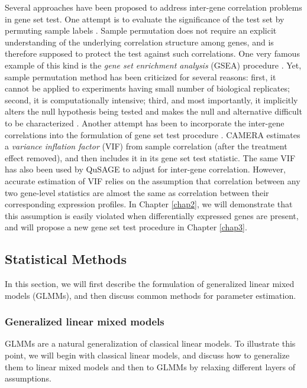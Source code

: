 Several approaches have been proposed to address inter-gene correlation problems in gene set test.
One attempt is to evaluate the significance of the test set by permuting sample labels
\citep{efron2007testing,gatti2010heading,subramanian2005gene}. Sample permutation does not require
an explicit understanding of the underlying correlation structure among genes, and is therefore
supposed to protect the test against such correlations. One very famous example of this kind is the
\textit{gene set enrichment analysis} (GSEA) procedure \citep{subramanian2005gene}. Yet, sample
permutation method has been criticized for several reasons: first, it cannot be applied to
experiments having small
number of biological replicates; second, it is computationally intensive; third, and most
importantly, it implicitly alters the null hypothesis being tested and makes the null and
alternative difficult to be characterized \citep{goeman2007analyzing, khatri2012ten, wu2012camera}.
Another attempt has been to incorporate the inter-gene correlations into the formulation of gene set
test procedure \citep{wu2012camera,yaari2013quantitative}. CAMERA \citep{wu2012camera} estimates a
\textit{variance
	inflation factor} (VIF) from sample correlation (after the treatment effect removed), and then
includes it in its gene set test statistic. The same VIF has also been used by QuSAGE
\cite{yaari2013quantitative} 
to adjust for inter-gene correlation. However, accurate estimation of VIF relies on
the assumption that correlation between any two gene-level statistics are almost the same as
correlation between their corresponding expression profiles. In Chapter \ref{chap2}, we will
demonstrate that this assumption is easily violated when differentially expressed genes are present,
and will propose a new gene set test procedure in Chapter \ref{chap3}.  

\subsection{Statistical Methods}\label{subsec:glmm}
In this section, we will first describe the formulation of generalized linear mixed models (GLMMs),
and then discuss common methods for parameter estimation.

\subsubsection{Generalized linear mixed models}\label{subsubsec:intro-stat-framework}
GLMMs are a natural generalization of classical linear models. To illustrate this point, we will
begin with classical linear models, and discuss how to generalize them to linear mixed models and
then to GLMMs by relaxing different layers of assumptions. 
